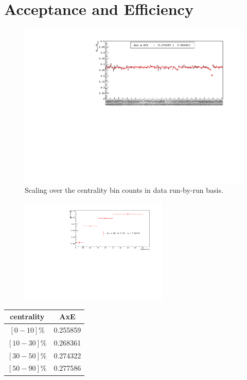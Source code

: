 \graphicspath{{Figures/}}

\section{Acceptance and Efficiency}

\begin{figure}[!h]
  \includegraphics[height=5.cm]{RAA/AxE/Indra_MC_AxE_2016_06_08/AxE_total.pdf}
  \caption{\scriptsize Scaling over the centrality bin counts in data run-by-run basis.}
\end{figure}       


\begin{figure}[!h]
  \begin{center}
    \includegraphics[height=5.0cm]{RAA/AxE/Indra_MC_AxE_2016_06_08/AxE_cent.pdf}%
  \end{center}
\end{figure}

\begin{center}
  {\tiny
    \begin{tabular} { c | c }
      \hline
      centrality   & AxE  \\\hline
      $[0-10]\%$   & 0.255859 \\
      $[10-30]\%$  & 0.268361 \\
      $[30-50]\%$  & 0.274322 \\
      $[50-90]\%$  & 0.277586 \\\hline
    \end{tabular}
  }
\end{center}


